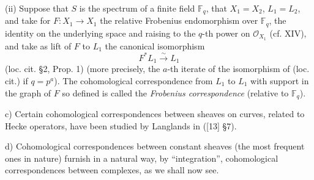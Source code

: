 (ii) Suppose that $S$ is the spectrum of a finite field $\mathbb F_q$, that $X_1=X_2$, $L_1=L_2$, and take for $F:X_1\to X_1$ the relative Frobenius endomorphism over $\mathbb F_q$, the identity on the underlying space and raising to the $q$-th power on $\mathcal O_{X_1}$ (cf. XIV), and take as lift of $F$ to $L_1$ the canonical isomorphism
\[
F^*L_1\xrightarrow{\sim}L_1
\]
(loc. cit. §2, Prop. 1) (more precisely, the $a$-th iterate of the isomorphism of (loc. cit.) if $q=p^a$). The cohomological correspondence from $L_1$ to $L_1$ with support in the graph of $F$ so defined is called the \emph{Frobenius correspondence} (relative to $\mathbb F_q$).

c) Certain cohomological correspondences between sheaves on curves, related to Hecke operators, have been studied by Langlands in ([13] §7).

d) Cohomological correspondences between constant sheaves (the most frequent ones in nature) furnish in a natural way, by ``integration'', cohomological correspondences between complexes, as we shall now see.


